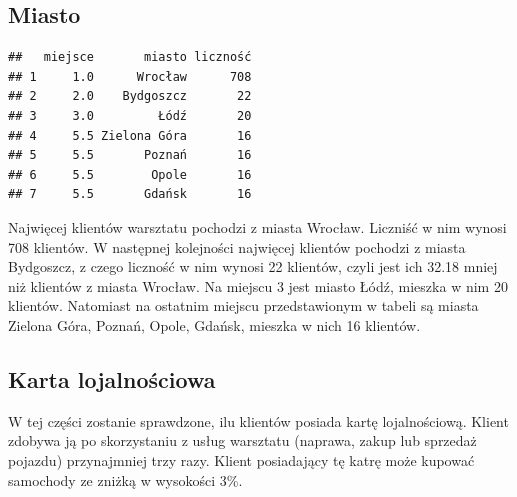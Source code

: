 \documentclass{article}\usepackage[]{graphicx}\usepackage[]{xcolor}
\makeatletter
\newenvironment{kframe}{%
 \def\at@end@of@kframe{}%
 \ifinner\ifhmode%
  \def\at@end@of@kframe{\end{minipage}}%
  \begin{minipage}{\columnwidth}%
 \fi\fi%
 \def\FrameCommand##1{\hskip\@totalleftmargin \hskip-\fboxsep
 \colorbox{shadecolor}{##1}\hskip-\fboxsep
     \hskip-\linewidth \hskip-\@totalleftmargin \hskip\columnwidth}%
 \MakeFramed {\advance\hsize-\width
   \@totalleftmargin\z@ \linewidth\hsize
   \@setminipage}}%
 {\par\unskip\endMakeFramed%
 \at@end@of@kframe}
\newenvironment{knitrout}{}{} %
\makeatother
\begin{document}
\subsection{Miasto}
\begin{knitrout}
\color{fgcolor}\begin{kframe}
\begin{verbatim}
##   miejsce       miasto liczność
## 1     1.0      Wrocław      708
## 2     2.0    Bydgoszcz       22
## 3     3.0         Łódź       20
## 4     5.5 Zielona Góra       16
## 5     5.5       Poznań       16
## 6     5.5        Opole       16
## 7     5.5       Gdańsk       16
\end{verbatim}
\end{kframe}
\end{knitrout}

Najwięcej klientów warsztatu pochodzi z miasta Wrocław. Liczniść w nim wynosi 708 klientów. W następnej kolejności najwięcej klientów pochodzi z miasta Bydgoszcz, z czego liczność w nim wynosi 22 klientów, czyli jest ich 32.18 mniej niż klientów z miasta Wrocław. Na miejscu 3 jest miasto Łódź, mieszka w nim 20 klientów. Natomiast na ostatnim miejscu przedstawionym w tabeli są miasta Zielona Góra, Poznań, Opole, Gdańsk, mieszka w nich 16 klientów.

\subsection{Karta lojalnościowa}

W tej części zostanie sprawdzone, ilu klientów posiada kartę lojalnościową. Klient zdobywa ją po skorzystaniu z usług warsztatu (naprawa, zakup lub sprzedaż pojazdu) przynajmniej trzy razy. Klient posiadający tę katrę może kupować samochody ze zniżką w wysokości 3\%.
\end{document}
